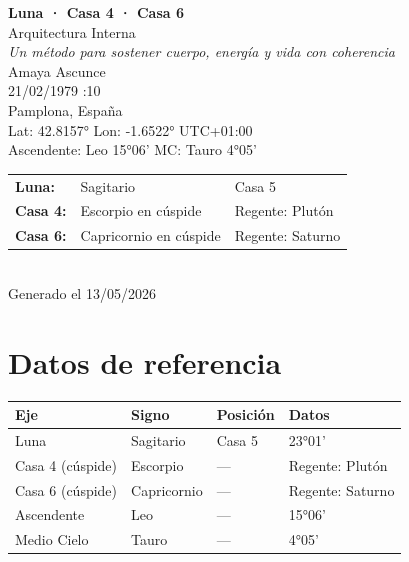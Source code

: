 \documentclass[11pt,a4paper]{article}
\begin{document}
\begin{titlepage}
  \centering
  \vspace*{1.5cm}
  {\Huge\bfseries\color{azulai} Luna · Casa 4 · Casa 6}\\[0.5cm]
  {\large\color{grisai} Arquitectura Interna}\\[0.3cm]
  {\small\itshape\color{grisai} Un método para sostener cuerpo, energía y vida con coherencia}\\[2cm]
  {\huge\color{doradoai} Amaya Ascunce}\\[1.5cm]
  {\Large 21/02/1979 :10}\\[0.3cm]
  {\Large Pamplona, España}\\[0.3cm]
  {\normalsize Lat: 42.8157° \quad Lon: -1.6522° \quad UTC+01:00}\\[0.3cm]
  {\normalsize Ascendente: Leo 15°06' \quad
    MC: Tauro 4°05'}\\[2cm]

  \begin{tabular}{lll}
    \textbf{Luna:} & Sagitario & Casa 5 \\
    \textbf{Casa 4:} & Escorpio en cúspide & Regente: Plutón \\
    \textbf{Casa 6:} & Capricornio en cúspide & Regente: Saturno \\
  \end{tabular}\\[2cm]

  \vfill
  {\small Generado el 13/05/2026}
\end{titlepage}

\tableofcontents
\clearpage

\section{Datos de referencia}

\begin{center}
\begin{tabular}{llll}
  \toprule
  \textbf{Eje} & \textbf{Signo} & \textbf{Posición} & \textbf{Datos} \\
  \midrule
  Luna & Sagitario & Casa 5 & 23°01' \\
  Casa 4 (cúspide) & Escorpio & --- & Regente: Plutón \\
  Casa 6 (cúspide) & Capricornio & --- & Regente: Saturno \\
  Ascendente & Leo & --- & 15°06' \\
  Medio Cielo & Tauro & --- & 4°05' \\
  \bottomrule
\end{tabular}
\end{center}
\end{document}

